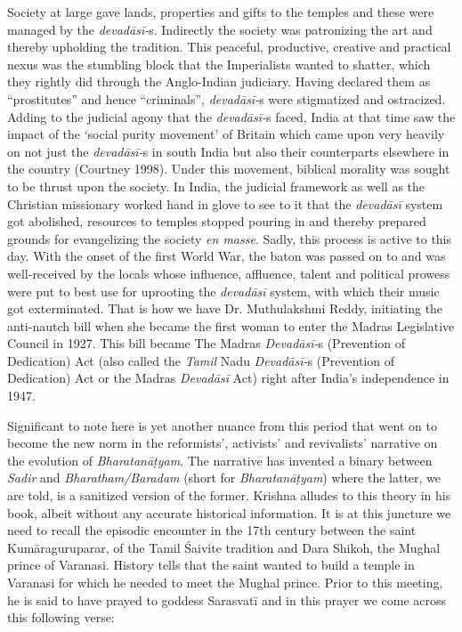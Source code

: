 {Society at large gave lands, properties and gifts to the temples and these were managed by the \textit{devadāsī-}s. Indirectly the society was patronizing the art and thereby upholding the tradition. This peaceful, productive, creative and practical nexus was the stumbling block that the Imperialists wanted to shatter, which they rightly did through the Anglo-Indian judiciary. Having declared them as “prostitutes” and hence “criminals”, \textit{devadāsī-}s were stigmatized and ostracized. Adding to the judicial agony that the \textit{devadāsī-}s faced, India at that time saw the impact of the ‘social purity movement’ of Britain which came upon very heavily on not just the \textit{devadāsī-}s in south India but also their counterparts elsewhere in the country (Courtney 1998). Under this movement, biblical morality was sought to be thrust upon the society. In India, the judicial framework as well as the Christian missionary worked hand in glove to see to it that the \textit{devadāsī} system got abolished, resources to temples stopped pouring in and thereby prepared grounds for evangelizing the society \textit{en masse}. Sadly, this process is active to this day. With the onset of the first World War, the baton was passed on to and was well-received by the locals whose influence, affluence, talent and political prowess were put to best use for uprooting the \textit{devadāsī} system, with which their music got exterminated. That is how we have Dr. Muthulakshmi Reddy, initiating the anti-nautch bill when she became the first woman to enter the Madras Legislative Council in 1927. This bill became The Madras \textit{Devadāsī-}s (Prevention of Dedication) Act (also called the \textit{Tamil} Nadu \textit{Devadāsī-}s (Prevention of Dedication) Act or the Madras \textit{Devadāsī} Act) right after India’s independence in 1947.

Significant to note here is yet another nuance from this period that went on to become the new norm in the reformists’, activists’ and revivalists’ narrative on the evolution of \textit{Bharatanāṭyam}. The narrative has invented a binary between \textit{Sadir} and \textit{Bharatham/Baradam }(short for\textit{ Bharatanāṭyam}) where the latter, we are told, is a sanitized version of the former. Krishna alludes to this theory in his book, albeit without any accurate historical information. It is at this juncture we need to recall the episodic encounter in the 17th century between the saint Kumāraguruparar, of the Tamil Śaivite tradition and Dara Shikoh, the Mughal prince of Varanasi. History tells that the saint wanted to build a temple in Varanasi for which he needed to meet the Mughal prince. Prior to this meeting, he is said to have prayed to goddess Sarasvatī and in this prayer we come across this following verse:

}
